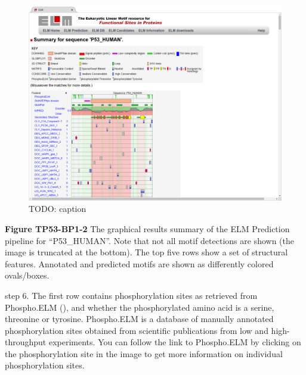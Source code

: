 \begin{figure}[h!]
\centering
\includegraphics[width=\textwidth]{Figures/TP53_1/elm_results_summary.png} 
\caption{
TODO: caption
}
\end{figure}

\textbf{Figure TP53-BP1-2} The graphical results summary of the ELM
Prediction pipeline for ``P53\_HUMAN''. Note that not all motif
detections are shown (the image is truncated at the bottom). The top
five rows show a set of structural features. Annotated and predicted
motifs are shown as differently colored ovals/boxes.

step 6. The first row contains phosphorylation sites as retrieved from
Phospho.ELM (\cite{21062810}), and whether the phosphorylated amino acid
is a serine, threonine or tyrosine. Phospho.ELM is a database of
manually annotated phosphorylation sites obtained from scientific
publications from low and high-throughput experiments. You can follow
the link to Phospho.ELM by clicking on the phosphorylation site in the
image to get more information on individual phosphorylation sites.



